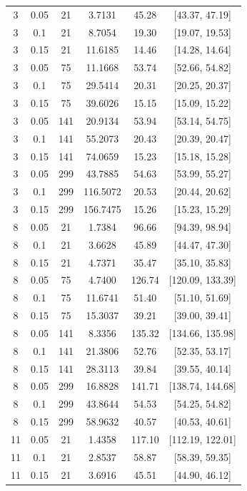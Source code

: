 \documentclass[10pt,a4paper]{article}
\begin{document}
\begin{center}
\begin{longtable}{cccccc}
    3 & 0.05 & 21 & 3.7131 & 45.28 & [43.37, 47.19] \\ 
    3 & 0.1 & 21 & 8.7054 & 19.30 & [19.07, 19.53] \\ 
    3 & 0.15 & 21 & 11.6185 & 14.46 & [14.28, 14.64] \\ 
    3 & 0.05 & 75 & 11.1668 & 53.74 & [52.66, 54.82] \\ 
    3 & 0.1 & 75 & 29.5414 & 20.31 & [20.25, 20.37] \\  
    3 & 0.15 & 75 & 39.6026 & 15.15 & [15.09, 15.22] \\ 
    3 & 0.05 & 141 & 20.9134 & 53.94 & [53.14, 54.75] \\
    3 & 0.1 & 141 & 55.2073 & 20.43 & [20.39, 20.47] \\
    3 & 0.15 & 141 & 74.0659 & 15.23 & [15.18, 15.28] \\
    3 & 0.05 & 299 & 43.7885 & 54.63 & [53.99, 55.27]\\
    3 & 0.1 & 299 & 116.5072 & 20.53 & [20.44, 20.62] \\
    3 & 0.15 & 299 & 156.7475 & 15.26 & [15.23, 15.29] \\
    8 & 0.05 & 21 & 1.7384 & 96.66 & [94.39, 98.94] \\
    8 & 0.1 & 21 & 3.6628 & 45.89 & [44.47, 47.30] \\
    8 & 0.15 & 21 & 4.7371 & 35.47 & [35.10, 35.83] \\ 
    8 & 0.05 & 75 & 4.7400 & 126.74 & [120.09, 133.39] \\
    8 & 0.1 & 75 & 11.6741 & 51.40 & [51.10, 51.69] \\
    8 & 0.15 & 75 & 15.3037 & 39.21 & [39.00, 39.41] \\
    8 & 0.05 & 141 & 8.3356 & 135.32 & [134.66, 135.98] \\
    8 & 0.1 & 141 & 21.3806 & 52.76 & [52.35, 53.17] \\
    8 & 0.15 & 141 & 28.3113 & 39.84 & [39.55, 40.14]\\
    8 & 0.05 & 299 & 16.8828 & 141.71 & [138.74, 144.68] \\
    8 & 0.1 & 299 & 43.8644 & 54.53 & [54.25, 54.82]\\
    8 & 0.15 & 299 & 58.9632 & 40.57 & [40.53, 40.61] \\
    11 & 0.05 & 21 & 1.4358 & 117.10 & [112.19, 122.01] \\
    11 & 0.1 & 21 & 2.8537 & 58.87 & [58.39, 59.35] \\
    11 & 0.15 & 21 & 3.6916 & 45.51 & [44.90, 46.12] \\

\end{longtable}
\end{center}
\end{document}
